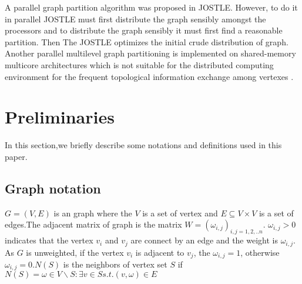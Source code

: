 \documentclass{acm_proc_article-sp}
\begin{document}
\par	
A parallel graph partition algorithm was proposed in JOSTLE. However, to do it in parallel JOSTLE must first distribute the graph sensibly amongst the processors and to distribute the graph sensibly it must first find a reasonable partition. Then The JOSTLE optimizes the initial crude distribution of graph. Another parallel multilevel graph partitioning is implemented on shared-memory multicore architectures which is not suitable for the distributed computing environment for the frequent topological information exchange among vertexes \cite{sui:parallel}.
\section{Preliminaries}
In this section,we briefly describe some notations and definitions used in this paper.
\par
\subsection{Graph notation}
$G=(V,E)$ is an graph where the $V$ is a set of vertex and $E \subseteq V \times V$ is a set of edges.The adjacent matrix of graph is the matrix $W=(\omega_{i,j})_{i,j=1,2,..n}$. $\omega_{i,j}>0$ indicates that the vertex $v_{i}$ and $v_{j}$ are connect by an edge and the weight is $\omega_{i,j}$. As $G$ is unweighted, if the vertex $v_{i}$ is adjacent to $v_{j}$, the $\omega_{i,j}=1$, otherwise $\omega_{i,j}=0$.$N(S)$ is the neighbors of vertex set $S$ if $N(S)={\omega\in V\backslash S:\exists v\in S s.t. (v,\omega)\in E}$
\end{document}
